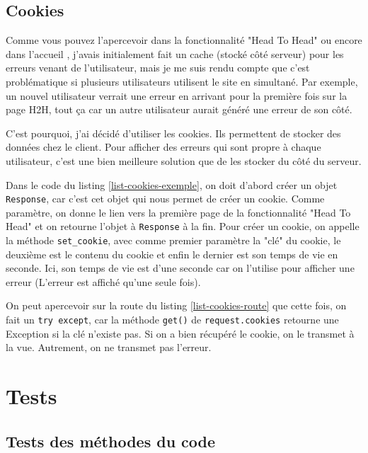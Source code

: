 \documentclass[a4paper,14pt]{extarticle}
\begin{document}
{\subsection{Cookies}
\label{cookies}

Comme vous pouvez l'apercevoir dans la fonctionnalité "Head To Head" ou encore dans l'accueil , j'avais initialement fait un cache (stocké côté serveur) pour les erreurs venant de l'utilisateur, mais je me suis rendu compte que c'est problématique si plusieurs utilisateurs utilisent le site en simultané. Par exemple, un nouvel utilisateur verrait une erreur en arrivant pour la première fois sur la page H2H, tout ça car un autre utilisateur aurait généré une erreur de son côté.

C'est pourquoi, j'ai décidé d'utiliser les cookies. Ils permettent de stocker des données chez le client. Pour afficher des erreurs qui sont propre à chaque utilisateur, c'est une bien meilleure solution que de les stocker du côté du serveur.


Dans le code du listing \ref{list-cookies-exemple}, on doit d'abord créer un objet \texttt{Response}, car c'est cet objet qui nous permet de créer un cookie. Comme paramètre, on donne le lien vers la première page de la fonctionnalité "Head To Head" et on retourne l'objet à \texttt{Response} à la fin. Pour créer un cookie, on appelle la méthode \texttt{set\_cookie}, avec comme premier paramètre la "clé" du cookie, le deuxième est le contenu du cookie et enfin le dernier est son temps de vie en seconde. Ici, son temps de vie est d'une seconde car on l'utilise pour afficher une erreur (L'erreur est affiché qu'une seule fois). 


On peut apercevoir sur la route du listing \ref{list-cookies-route} que cette fois, on fait un \texttt{try except}, car la méthode \texttt{get()} de \texttt{request.cookies} retourne une Exception si la clé n'existe pas. Si on a bien récupéré le cookie, on le transmet à la vue. Autrement, on ne transmet pas l'erreur.

\newpage

\section{Tests}

\subsection{Tests des méthodes du code}

}
\end{document}
